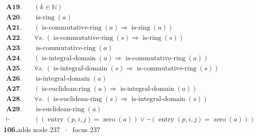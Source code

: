 \documentclass[11pt]{article}
\theoremstyle{plain}
\newcommand{\fit}[1]{\resizebox{\ifdim\width>\linewidth\linewidth\else\width\fi}{!}{#1}}
\begin{document}
\begin{align*}
  \mathbf{A19.}\quad & (k \in \mathbb{N}) \\
  \mathbf{A20.}\quad & \operatorname{is\text{-}ring}(a) \\
  \mathbf{A21.}\quad & (\operatorname{is\text{-}commutative\text{-}ring}(a) \Rightarrow \operatorname{is\text{-}ring}(a)) \\
  \mathbf{A22.}\quad & \forall s.\; (\operatorname{is\text{-}commutative\text{-}ring}(s) \Rightarrow \operatorname{is\text{-}ring}(s)) \\
  \mathbf{A23.}\quad & \operatorname{is\text{-}commutative\text{-}ring}(a) \\
  \mathbf{A24.}\quad & (\operatorname{is\text{-}integral\text{-}domain}(a) \Rightarrow \operatorname{is\text{-}commutative\text{-}ring}(a)) \\
  \mathbf{A25.}\quad & \forall s.\; (\operatorname{is\text{-}integral\text{-}domain}(s) \Rightarrow \operatorname{is\text{-}commutative\text{-}ring}(s)) \\
  \mathbf{A26.}\quad & \operatorname{is\text{-}integral\text{-}domain}(a) \\
  \mathbf{A27.}\quad & (\operatorname{is\text{-}euclidean\text{-}ring}(a) \Rightarrow \operatorname{is\text{-}integral\text{-}domain}(a)) \\
  \mathbf{A28.}\quad & \forall s.\; (\operatorname{is\text{-}euclidean\text{-}ring}(s) \Rightarrow \operatorname{is\text{-}integral\text{-}domain}(s)) \\
  \mathbf{A29.}\quad & \operatorname{is\text{-}euclidean\text{-}ring}(a) \\
  \vdash\quad & ((\operatorname{entry}(p, i, j) = \operatorname{zero}(a)) \vee \neg (\operatorname{entry}(p, i, j) = \operatorname{zero}(a)))
\end{align*}
\medskip\noindent\textbf{106.}\quad \fit{\texttt{(pbc)}}\hfill{\small adds node 237 $\;\cdot\;$ focus 237}\\[2pt]
\end{document}
